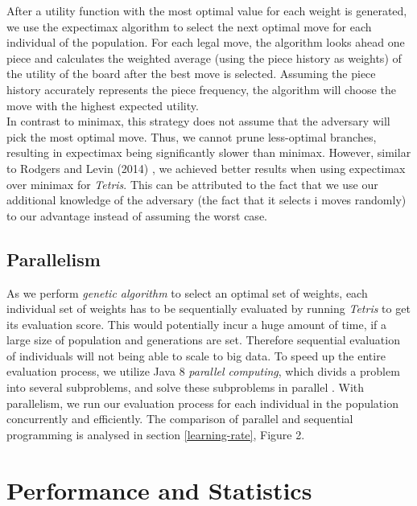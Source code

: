 \documentclass{article} %
\begin{document}
\begin{multicols}{2}
\noindent
After a utility function with the most optimal value for each weight is generated, we use the expectimax algorithm to select the next optimal move for each individual of the population. For each legal move, the algorithm looks ahead one piece and calculates the weighted average (using the piece history as weights) of the utility of the board after the best move is selected. Assuming the piece history accurately represents the piece frequency, the algorithm will choose the move with the highest expected utility. \\

\noindent
In contrast to minimax, this strategy does not assume that the adversary will pick the most optimal move. Thus, we cannot prune less-optimal branches, resulting in expectimax being significantly slower than minimax. However, similar to Rodgers and Levin (2014) \cite{expectimax}, we achieved better results when using expectimax over minimax for \textsl{Tetris}. This can be attributed to the fact that we use our additional knowledge of the adversary (the fact that it selects i moves randomly) to our advantage instead of assuming the worst case.

% 
% 
% 
\subsection{Parallelism} \label{para}
As we perform \textsl{genetic algorithm} to select an optimal set of weights, each individual set of weights has to be sequentially evaluated by running \textsl{Tetris} to get its evaluation score. This would potentially incur a huge amount of time, if a large size of population and generations are set. Therefore sequential evaluation of individuals will not being able to scale to big data. To speed up the entire evaluation process, we utilize Java 8 \textsl{parallel computing}, which divids a problem into several subproblems, and solve these subproblems in parallel \cite{parallel}. With parallelism, we run our evaluation process for each individual in the population concurrently and efficiently. The comparison of parallel and sequential programming is analysed in section \ref{learning-rate}, Figure 2.



\section{Performance and Statistics} \label{results}

\end{multicols}
\end{document}
